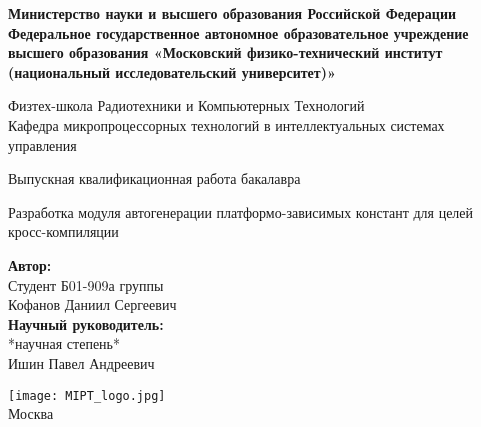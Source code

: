 \begin{center}
    \large\textbf{Министерство науки и высшего образования Российской Федерации
    Федеральное государственное автономное образовательное учреждение высшего образования
    «Московский физико-технический институт (национальный исследовательский университет)»} \\
    \vspace{1cm}

    Физтех-школа Радиотехники и Компьютерных Технологий \\

    Кафедра микропроцессорных технологий в интеллектуальных системах управления \\

    \vspace{3em}

    Выпускная квалификационная работа бакалавра
\end{center}

\begin{center}
    \vspace{\fill}
    \LARGE{Разработка модуля автогенерации платформо-зависимых констант для целей кросс-компиляции}

    \vspace{\fill}
\end{center}


\begin{flushright}
    \textbf{Автор:} \\
    Студент Б01-909а группы \\
    Кофанов Даниил Сергеевич \\
    \vspace{2em}
    \textbf{Научный руководитель:} \\
    *научная степень* \\
    Ишин Павел Андреевич \\
\end{flushright}

\vspace{7em}

\begin{center}
    \texttt{[image: MIPT\_logo.jpg]}\\
    Москва \the\year{}
\end{center}

\thispagestyle{empty}

\newpage
\fancyfoot[c]{\thepage}
\fancyhead[R]{}
